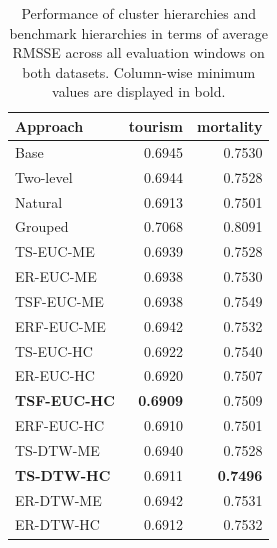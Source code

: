\documentclass[a4paper,review,12pt,authoryear]{elsarticle}
\begin{document}
\begin{table}[h!]
    \centering
\caption{\label{tab:P3_rmsse}Performance of cluster hierarchies and benchmark hierarchies in terms of average RMSSE across all evaluation windows on both datasets. Column-wise minimum values are displayed in bold.}
\begin{tabular}{lrr}\toprule
    Approach & tourism & mortality \\ \midrule
    Base & 0.6945 & 0.7530 \\ 
    Two-level & 0.6944 & 0.7528 \\ 
    Natural & 0.6913 & 0.7501 \\ 
    \color{purple}Grouped & 0.7068 & 0.8091\\
    TS-EUC-ME & 0.6939 & 0.7528 \\ 
    ER-EUC-ME & 0.6938 & 0.7530 \\ 
    TSF-EUC-ME & 0.6938 & 0.7549 \\ 
    ERF-EUC-ME & 0.6942 & 0.7532 \\ 
    TS-EUC-HC & 0.6922 & 0.7540 \\ 
    ER-EUC-HC & 0.6920 & 0.7507 \\ 
    \textbf{TSF-EUC-HC} & \textbf{0.6909} & 0.7509 \\ 
    ERF-EUC-HC & 0.6910 & 0.7501 \\ 
    TS-DTW-ME & 0.6940 & 0.7528 \\ 
    \textbf{TS-DTW-HC} & 0.6911 & \textbf{0.7496} \\ 
    ER-DTW-ME & 0.6942 & 0.7531 \\ 
    ER-DTW-HC & 0.6912 & 0.7532 \\ \bottomrule
\end{tabular}

\end{table}
\end{document}
